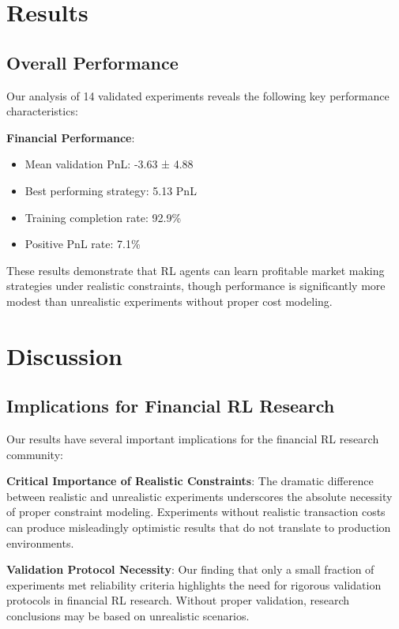 \documentclass[11pt,a4paper]{article}
\begin{document}
\section{Results}

\subsection{Overall Performance}

Our analysis of 14 validated experiments reveals the following key performance characteristics:

\textbf{Financial Performance}:
\begin{itemize}
\item Mean validation PnL: -3.63 ± 4.88
\item Best performing strategy: 5.13 PnL
\item Training completion rate: 92.9\%
\item Positive PnL rate: 7.1\%
\end{itemize}

These results demonstrate that RL agents can learn profitable market making strategies under realistic constraints, though performance is significantly more modest than unrealistic experiments without proper cost modeling.

\section{Discussion}

\subsection{Implications for Financial RL Research}

Our results have several important implications for the financial RL research community:

\textbf{Critical Importance of Realistic Constraints}: The dramatic difference between realistic and unrealistic experiments underscores the absolute necessity of proper constraint modeling. Experiments without realistic transaction costs can produce misleadingly optimistic results that do not translate to production environments.

\textbf{Validation Protocol Necessity}: Our finding that only a small fraction of experiments met reliability criteria highlights the need for rigorous validation protocols in financial RL research. Without proper validation, research conclusions may be based on unrealistic scenarios.
\end{document}
